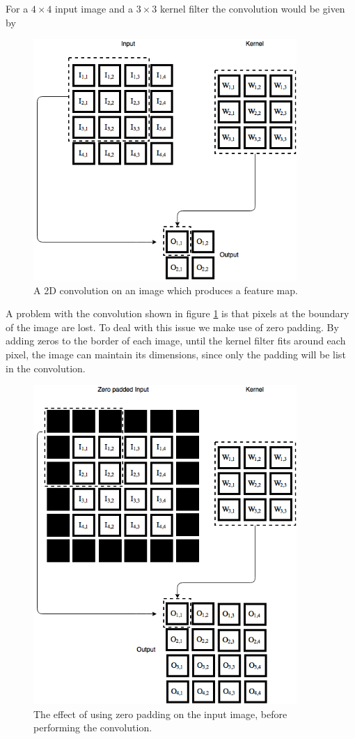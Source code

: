 \documentclass[11pt]{article}
\begin{document}
For a $4 \times 4$ input image and a $3 \times 3$ kernel filter the convolution
would be given by
\begin{figure}[!h]
    \centering
    \includegraphics[width=10cm]{include/conv_2.png}
    \caption{A 2D convolution on an image which produces a feature map.}
    \label{fig:conv}
\end{figure}
\newpage
A problem with the convolution shown in figure \ref{fig:conv} is that
pixels at the boundary of the image are lost.
To deal with this issue we make use of zero padding.
By adding zeros to the border of each image, until the kernel
filter fits around each pixel, the image can maintain its dimensions, since
only the padding will be list in the convolution.
\begin{figure}[H]
    \centering
    \includegraphics[width=10cm]{include/conv_2_zero_pad.png}
    \caption{The effect of using zero padding on the input image,
             before performing the convolution.}
    \label{fig:conv2}
\end{figure}
\end{document}
